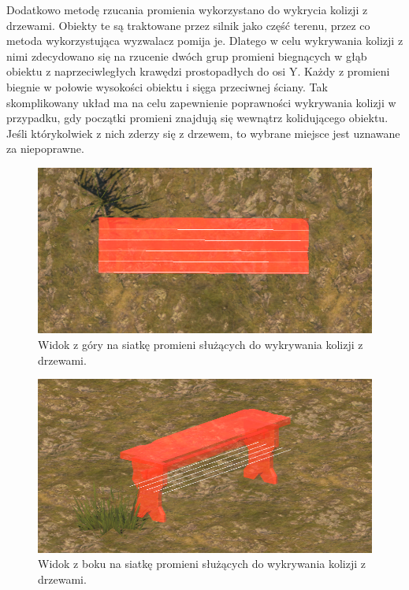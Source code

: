 Dodatkowo metodę rzucania promienia wykorzystano do wykrycia kolizji z drzewami. Obiekty te są traktowane przez silnik
jako część terenu, przez co metoda wykorzystująca wyzwalacz pomija je. Dlatego w celu wykrywania kolizji z nimi
zdecydowano się na rzucenie dwóch grup promieni biegnących w głąb obiektu z naprzeciwległych krawędzi prostopadłych do
osi Y. Każdy z promieni biegnie w połowie wysokości obiektu i sięga przeciwnej ściany. Tak skomplikowany układ ma na
celu zapewnienie poprawności wykrywania kolizji w przypadku, gdy początki promieni znajdują się wewnątrz kolidującego
obiektu. Jeśli którykolwiek z nich zderzy się z drzewem, to wybrane miejsce jest uznawane za niepoprawne.

\begin{figure}[h!]
   \centering
   \includegraphics[width=1\textwidth]{images/implementacja/mechanizm_budowania/gizmos_drzewo_2.png}
   \caption{Widok z góry na siatkę promieni służących do wykrywania kolizji z drzewami.}
\end{figure}
\FloatBarrier
\begin{figure}[h!]
   \centering
   \includegraphics[width=1\textwidth]{images/implementacja/mechanizm_budowania/gizmos_drzewo_1.png}
   \caption{Widok z boku na siatkę promieni służących do wykrywania kolizji z drzewami.}
\end{figure}
\FloatBarrier
